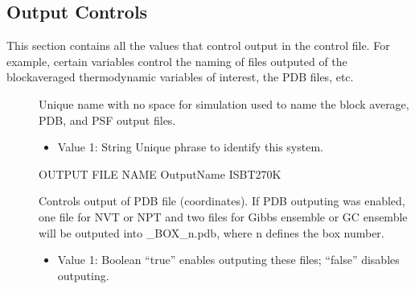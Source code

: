\documentclass[letterpaper,10pt,english]{sphinxmanual}
\begin{document}
\subsection{Output Controls}
\label{\detokenize{input_file:output-controls}}
\sphinxAtStartPar
This section contains all the values that control output in the control file. For example, certain variables control the naming of files outputed of the block\sphinxhyphen{}averaged thermodynamic variables of interest, the PDB files, etc.
\begin{description}
\item[{}] \leavevmode
\sphinxAtStartPar
Unique name with no space for simulation used to name the block average, PDB, and PSF output files.
\begin{itemize}
\item {} 
\sphinxAtStartPar
Value 1: String \sphinxhyphen{} Unique phrase to identify this system.

\end{itemize}

\begin{sphinxVerbatim}[commandchars=\\\{\}]
\PYGZsh{}\PYGZsh{}\PYGZsh{}\PYGZsh{}\PYGZsh{}\PYGZsh{}\PYGZsh{}\PYGZsh{}\PYGZsh{}\PYGZsh{}\PYGZsh{}\PYGZsh{}\PYGZsh{}\PYGZsh{}\PYGZsh{}\PYGZsh{}\PYGZsh{}\PYGZsh{}\PYGZsh{}\PYGZsh{}\PYGZsh{}\PYGZsh{}\PYGZsh{}\PYGZsh{}\PYGZsh{}\PYGZsh{}\PYGZsh{}\PYGZsh{}\PYGZsh{}\PYGZsh{}\PYGZsh{}\PYGZsh{}\PYGZsh{}
\PYGZsh{} OUTPUT FILE NAME
\PYGZsh{}\PYGZsh{}\PYGZsh{}\PYGZsh{}\PYGZsh{}\PYGZsh{}\PYGZsh{}\PYGZsh{}\PYGZsh{}\PYGZsh{}\PYGZsh{}\PYGZsh{}\PYGZsh{}\PYGZsh{}\PYGZsh{}\PYGZsh{}\PYGZsh{}\PYGZsh{}\PYGZsh{}\PYGZsh{}\PYGZsh{}\PYGZsh{}\PYGZsh{}\PYGZsh{}\PYGZsh{}\PYGZsh{}\PYGZsh{}\PYGZsh{}\PYGZsh{}\PYGZsh{}\PYGZsh{}\PYGZsh{}\PYGZsh{}
OutputName  ISB\PYGZus{}T\PYGZus{}270\PYGZus{}K
\end{sphinxVerbatim}

\item[{}] \leavevmode
\sphinxAtStartPar
Controls output of PDB file (coordinates). If PDB outputing was enabled, one file for NVT or NPT and
two files for Gibbs ensemble or GC ensemble will be outputed into \_BOX\_n.pdb, where n defines the box number.
\begin{itemize}
\item {} 
\sphinxAtStartPar
Value 1: Boolean \sphinxhyphen{} “true” enables outputing these files; “false” disables outputing.


\end{itemize}
\end{description}
\end{document}
